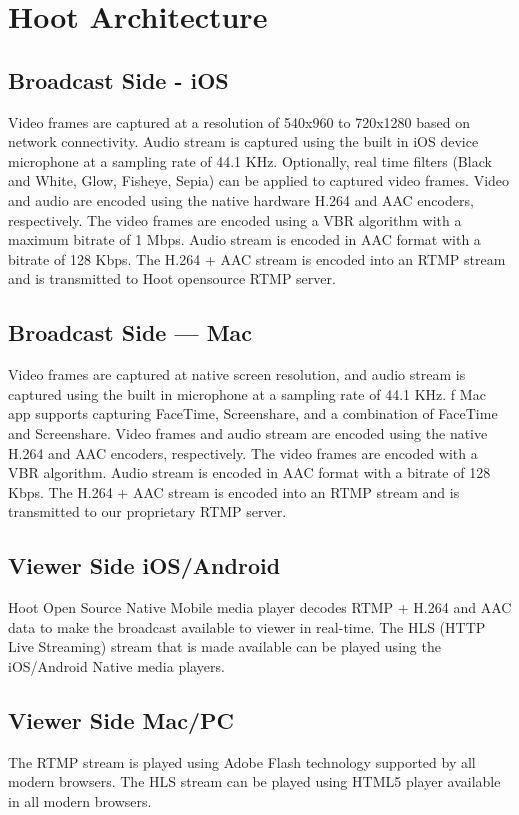 \section{Hoot Architecture}
\subsection{Broadcast Side - iOS}
Video frames are captured at a resolution of 540x960 to 720x1280 based on network connectivity. Audio stream is captured using the built in iOS device microphone at a sampling rate of 44.1 KHz. Optionally, real time filters (Black and White, Glow, Fisheye, Sepia) can be applied to captured video frames. Video and audio are encoded using the native hardware H.264 and AAC encoders, respectively. The video frames are encoded using a VBR algorithm with a maximum bitrate of 1 Mbps. Audio stream is encoded in AAC format with a bitrate of 128 Kbps. The H.264 + AAC stream is encoded into an RTMP stream and is transmitted to Hoot opensource RTMP server.

\subsection{Broadcast Side — Mac}
Video frames are captured at native screen resolution, and audio stream is captured using the built in microphone at a sampling rate of 44.1 KHz. f Mac app supports capturing FaceTime, Screenshare, and a combination of FaceTime and Screenshare. Video frames and audio stream are encoded using the native H.264 and AAC encoders, respectively. The video frames are encoded with a VBR algorithm. Audio stream is encoded in AAC format with a bitrate of 128 Kbps. The H.264 + AAC stream is encoded into an RTMP stream and is transmitted to our proprietary RTMP server.

\subsection{Viewer Side iOS/Android }
 Hoot Open Source Native Mobile media player decodes RTMP + H.264 and AAC data to make the broadcast available to viewer in real-time. The HLS (HTTP Live Streaming) stream that is made available can be played using the iOS/Android Native media players.

\subsection{Viewer Side Mac/PC} 
The RTMP stream is played using Adobe Flash technology supported by all modern browsers. The HLS stream can be played using HTML5 player available in all modern browsers.
